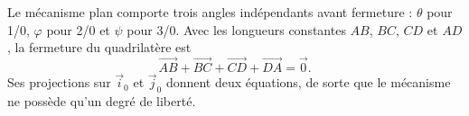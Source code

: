 \begin{corrigebox}
Le mécanisme plan comporte trois angles indépendants avant fermeture :
$\theta$ pour 1/0, $\varphi$ pour 2/0 et $\psi$ pour 3/0. Avec les longueurs
constantes $AB$, $BC$, $CD$ et $AD$, la fermeture du quadrilatère est
\[\overrightarrow{AB}+\overrightarrow{BC}+\overrightarrow{CD}
  +\overrightarrow{DA}=\vec0.\]
Ses projections sur $\vec i_0$ et $\vec j_0$ donnent deux équations, de sorte
que le mécanisme ne possède qu'un degré de liberté.
\end{corrigebox}
